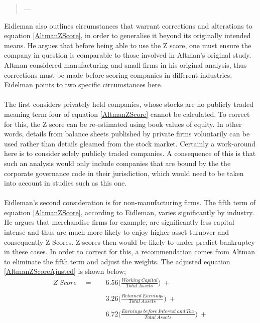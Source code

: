 {\begin {quote}
\hspace{2cm}---  \cite {eidleman1995z}
\end{quote}
Eidleman also outlines circumstances that warrant corrections and alterations to equation \ref{AltmanZScore}, in order to generalise it beyond its originally intended means. He argues that before being able to use the Z score, one must ensure the company in question is comparable to those involved in Altman's original study. Altman considered manufacturing and small firms in his original analysis, thus corrections must be made before scoring companies in different industries. Eidelman points to two specific circumstances here. \\\\
The first considers privately held companies, whose stocks are no publicly traded meaning term four of equation \ref{AltmanZScore} cannot be calculated. To correct for this, the Z score can be re-estimated using book values of equity. In other words, details from balance sheets published by private firms voluntarily can be used rather than details gleamed from the stock market. Certainly a work-around here is to consider solely publicly traded companies. A consequence of this is that such an analysis would only include companies that are bound by the the corporate governance code in their jurisdiction, which would need to be taken into account in studies such as this one.\\\\ Eidleman's second consideration is for non-manufacturing firms. The fifth term of equation \ref{AltmanZScore}, according to Eidleman, varies significantly by industry. He argues that merchandise firms for example, are significantly less capital intense and thus are much more likely to enjoy higher asset turnover and consequently Z-Scores. Z scores then would be likely to under-predict bankruptcy in these cases. In order to correct for this, a recommendation comes from Altman to eliminate the fifth term and adjust the weights. The adjusted equation \ref{AltmanZScoreAjusted} is shown below;
\begin {equation}\label{AltmanZScoreAjusted}
\begin{aligned}
Z \ Score \quad =  \quad & 6.56\bigg(\frac{Working \ Capital}{Total \ Assets}\bigg) \ + \\\\
		& 3.26\bigg({\frac{Retained \ Earnings}{Total \ Assets}}\bigg) \ + \\\\
		& 6.72\bigg({\frac{Earnings \ before \ Interest \ and \ Tax}{Total \ Assets}}\bigg) \ + \\\\

\end{aligned}
\end{equation}}
